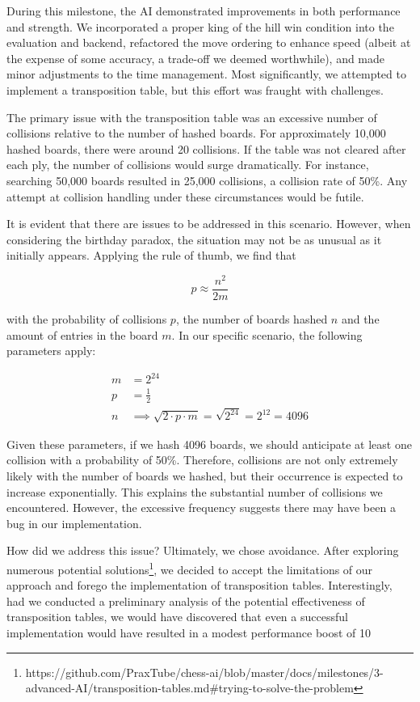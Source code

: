 During this milestone, the AI demonstrated improvements in both performance and strength. We incorporated a proper king of the hill win condition into the evaluation and backend, refactored the move ordering to enhance speed (albeit at the expense of some accuracy, a trade-off we deemed worthwhile), and made minor adjustments to the time management. Most significantly, we attempted to implement a transposition table, but this effort was fraught with challenges.

The primary issue with the transposition table was an excessive number of collisions relative to the number of hashed boards. For approximately 10,000 hashed boards, there were around 20 collisions. If the table was not cleared after each ply, the number of collisions would surge dramatically. For instance, searching 50,000 boards resulted in 25,000 collisions, a collision rate of 50\%. Any attempt at collision handling under these circumstances would be futile.

It is evident that there are issues to be addressed in this scenario. However, when considering the birthday paradox, the situation may not be as unusual as it initially appears. Applying the rule of thumb, we find that

$$ p \approx \frac{n^2}{2m} $$

with the probability of collisions $p$,
the number of boards hashed $n$ and the amount of entries in the board $m$.
In our specific scenario, the following parameters apply:

\begin{align*}
m &= 2^{24} \\
p &= \frac{1}{2} \\
n &\implies \sqrt{2 \cdot p \cdot m} = \sqrt{2^{24}} = 2^{12} = 4096
\end{align*}

Given these parameters, if we hash 4096 boards, we should anticipate at least one collision with a probability of 50\%. Therefore, collisions are not only extremely likely with the number of boards we hashed, but their occurrence is expected to increase exponentially. This explains the substantial number of collisions we encountered. However, the excessive frequency suggests there may have been a bug in our implementation.

How did we address this issue? Ultimately, we chose avoidance. After exploring numerous potential solutions\footnote{https://github.com/PraxTube/chess-ai/blob/master/docs/milestones/3-advanced-AI/transposition-tables.md\#trying-to-solve-the-problem}, we decided to accept the limitations of our approach and forego the implementation of transposition tables. Interestingly, had we conducted a preliminary analysis of the potential effectiveness of transposition tables, we would have discovered that even a successful implementation would have resulted in a modest performance boost of 10%

